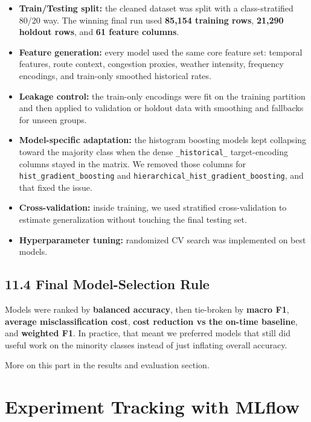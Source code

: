 \documentclass{article}
\newcommand{\code}[1]{\texttt{\small #1}}
\begin{document}
\begin{itemize}[label=\textcolor{accentblue}{\textbullet}]
    \item \textbf{Train/Testing split:} the cleaned dataset was split with a class-stratified 80/20 way. The winning final run used \textbf{85,154 training rows}, \textbf{21,290 holdout rows}, and \textbf{61 feature columns}.
    \item \textbf{Feature generation:} every model used the same core feature set: temporal features, route context, congestion proxies, weather intensity, frequency encodings, and train-only smoothed historical rates.
    \item \textbf{Leakage control:} the train-only encodings were fit on the training partition and then applied to validation or holdout data with smoothing and fallbacks for unseen groups.
    \item \textbf{Model-specific adaptation:} the histogram boosting models kept collapsing toward the majority class when the dense \code{\_historical\_} target-encoding columns stayed in the matrix. We removed those columns for \code{hist\_gradient\_boosting} and \code{hierarchical\_hist\_gradient\_boosting}, and that fixed the issue.
    \item \textbf{Cross-validation:} inside training, we used stratified cross-validation to estimate generalization without touching the final testing set.
    \item \textbf{Hyperparameter tuning:} randomized CV search was implemented on best models.
\end{itemize}

\subsection*{\textcolor{accentgold}{11.4 Final Model-Selection Rule}}

Models were ranked by \textbf{balanced accuracy}, then tie-broken by \textbf{macro F1}, \textbf{average misclassification cost}, \textbf{cost reduction vs the on-time baseline}, and \textbf{weighted F1}. In practice, that meant we preferred models that still did useful work on the minority classes instead of just inflating overall accuracy.

More on this part in the results and evaluation section.

\section{\textcolor{accentblue}{Experiment Tracking with MLflow}}
\end{document}
